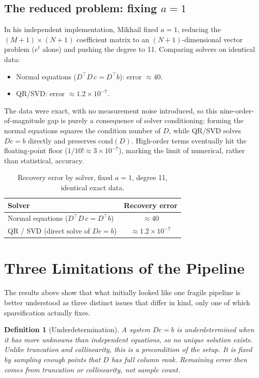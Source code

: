 \documentclass[11pt]{article}
\newtheorem{definition}{Definition}
\begin{document}
\subsection{The reduced problem: fixing $a=1$}

In his independent implementation, Mikhail fixed $a=1$, reducing the $(M+1)\times(N+1)$
coefficient matrix to an $(N+1)$-dimensional vector problem ($e^{t}$ alone) and pushing
the degree to 11. Comparing solvers on identical data:
\begin{itemize}
  \item Normal equations ($D^{\top}D\, c = D^{\top}b$): error $\approx 40$.
  \item QR/SVD: error $\approx 1.2 \times 10^{-7}$.
\end{itemize}
The data were exact, with no measurement noise introduced, so this nine-order-of-magnitude
gap is purely a consequence of solver conditioning: forming the normal equations squares
the condition number of $D$, while QR/SVD solves $Dc=b$ directly and preserves
$\mathrm{cond}(D)$. High-order terms eventually hit the floating-point floor
($1/10! \approx 3\times 10^{-7}$), marking the limit of numerical, rather than
statistical, accuracy.

\begin{table}[h]
\centering
\caption{Recovery error by solver, fixed $a=1$, degree 11, identical exact data.}
\label{tab:solver-comparison}
\begin{tabular}{@{}lc@{}}
\toprule
Solver & Recovery error \\
\midrule
Normal equations ($D^{\top}D\, c = D^{\top}b$) & $\approx 40$ \\
QR / SVD (direct solve of $Dc=b$)              & $\approx 1.2 \times 10^{-7}$ \\
\bottomrule
\end{tabular}
\end{table}

\section{Three Limitations of the Pipeline}

The results above show that what initially looked like one fragile pipeline is better
understood as three distinct issues that differ in kind, only one of which
sparsification actually fixes.

\begin{definition}[Underdetermination]
A system $Dc = b$ is underdetermined when it has more unknowns than independent equations, so no unique solution exists. Unlike truncation and collinearity, this is a precondition of the setup. It is fixed by sampling enough points that $D$ has full column rank. Remaining error then comes from truncation or collinearity, not sample count.
\end{definition}
\end{document}
